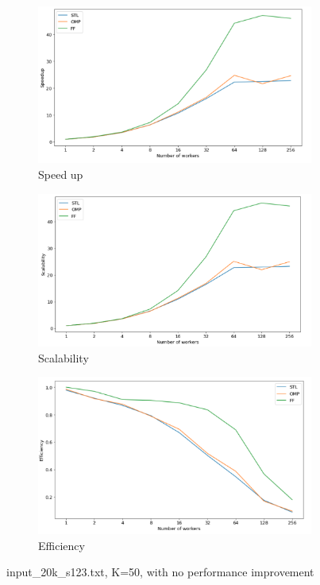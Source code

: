 \documentclass[12pt,a4paper]{report}
\begin{document}
\begin{figure}
     \centering
     \begin{subfigure}[b]{0.45\textwidth}
         \centering
         \includegraphics[width=\textwidth]{images/main-20k/speedup.png}
         \caption{Speed up}
         \label{fig:y equals x}
     \end{subfigure}
     \hfill
     \begin{subfigure}[b]{0.45\textwidth}
         \centering
         \includegraphics[width=\textwidth]{images/main-20k/scalability.png}
         \caption{Scalability}
         \label{fig:three sin x}
     \end{subfigure}
     \hfill
     \begin{subfigure}[b]{0.45\textwidth}
         \centering
         \includegraphics[width=\textwidth]{images/main-20k/efficiency.png}
         \caption{Efficiency}
         \label{fig:improved performance}
     \end{subfigure}
        \caption{input\_20k\_s123.txt, K=50, with no performance improvement}
        \label{fig:three graphs}
\end{figure}
\end{document}
